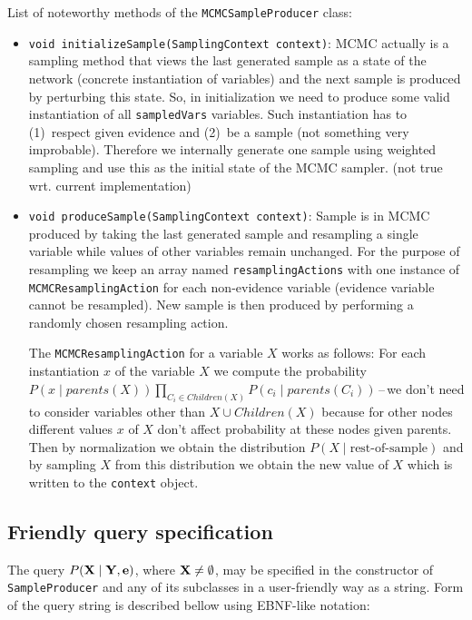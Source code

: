 \documentclass[english,cover]{fitthesis} %
\newcommand{\srccode}[1]{{\tt #1}}         %
\newcommand{\vars}[1]{{\bold{#1}}}         %
\newcommand{\todo}[1]{{\color{red}#1}}
\begin{document}
\medskip
List of noteworthy methods of the \srccode{MCMCSampleProducer} class:
\begin{itemize}
	\item \srccode{void initializeSample(SamplingContext context)}: MCMC actually is a sampling method that views the last generated sample as a state of the network (concrete instantiation of variables) and the next sample is produced by perturbing this state. So, in initialization we need to produce some valid instantiation of all \srccode{sampledVars} variables. Such instantiation has to (1)~respect given evidence and (2)~be a  sample (not something very improbable). Therefore we internally generate one sample using weighted sampling and use this as the initial state of the MCMC sampler. \todo{(not true wrt. current implementation)}
	\item \srccode{void produceSample(SamplingContext context)}: Sample is in MCMC produced by taking the last generated sample and resampling a single variable while values of other variables remain unchanged. For the purpose of resampling we keep an array named \srccode{resamplingActions} with one instance of \srccode{MCMCResamplingAction} for each non-evidence variable (evidence variable cannot be resampled). New sample is then produced by performing a randomly chosen resampling action.
	
	The \srccode{MCMCResamplingAction} for a variable $X$ works as follows: For each instantiation $x$ of the variable $X$ we compute the probability $P(x \mid parents(X)) \prod_{C_i \in Children(X)} P(c_i \mid parents(C_i))$\,--\,we don't need to consider variables other than $X \cup Children(X)$ because for other nodes different values $x$ of $X$ don't affect probability at these nodes given parents. Then by normalization we obtain the distribution $P(X \mid \text{rest-of-sample})$ and by sampling $X$ from this distribution we obtain the new value of $X$ which is written to the \srccode{context} object.
\end{itemize}


\subsection{Friendly query specification}
The query $P(\vars{X} \mid \vars{Y}, \vars{e})$, where $\vars{X} \neq \emptyset$, may be specified in the constructor of \srccode{SampleProducer} and any of its subclasses in a user-friendly way as a string. Form of the query string is described bellow using EBNF-like notation:
\end{document}
